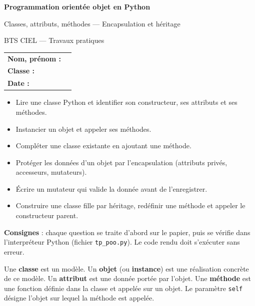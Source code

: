 \documentclass[11pt,a4paper]{article}
\newif\ifcorrige
\newcommand{\py}[1]{\texttt{#1}}
\begin{document}
\begin{center}
{\LARGE\bfseries Programmation orientée objet en Python\par}
\smallskip
{\large Classes, attributs, méthodes --- Encapsulation et héritage\par}
\medskip
BTS CIEL --- Travaux pratiques
\ifcorrige\par\textcolor{corr}{\textbf{Version enseignant --- corrigés intégrés}}\fi
\end{center}

\medskip
\noindent\begin{tabularx}{\textwidth}{@{}>{\bfseries}l X@{}}
Nom, prénom : & \ifcorrige\textcolor{corr}{corrigé}\else\dotfill\fi \\
Classe : & \ifcorrige\textcolor{corr}{---}\else\dotfill\fi \\
Date : & \ifcorrige\textcolor{corr}{---}\else\dotfill\fi \\
\end{tabularx}

\begin{methode}[Objectifs du TP]
\begin{itemize}
  \item Lire une classe Python et identifier son constructeur, ses attributs et ses méthodes.
  \item Instancier un objet et appeler ses méthodes.
  \item Compléter une classe existante en ajoutant une méthode.
  \item Protéger les données d'un objet par l'encapsulation (attributs privés, accesseurs, mutateurs).
  \item Écrire un mutateur qui valide la donnée avant de l'enregistrer.
  \item Construire une classe fille par héritage, redéfinir une méthode et appeler le constructeur parent.
\end{itemize}
\textbf{Consignes} : chaque question se traite d'abord sur le papier, puis se vérifie dans
l'interpréteur Python (fichier \py{tp\_poo.py}). Le code rendu doit s'exécuter sans erreur.
\end{methode}

\begin{rappel}
Une \textbf{classe} est un modèle. Un \textbf{objet} (ou \textbf{instance}) est une réalisation
concrète de ce modèle. Un \textbf{attribut} est une donnée portée par l'objet. Une
\textbf{méthode} est une fonction définie dans la classe et appelée sur un objet. Le paramètre
\py{self} désigne l'objet sur lequel la méthode est appelée.
\end{rappel}
\end{document}
